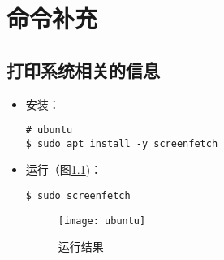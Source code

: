 \chapter{命令补充}

\section{打印系统相关的信息}
\begin{itemize}
\item 安装：
\begin{lstlisting}
# ubuntu 
$ sudo apt install -y screenfetch 
\end{lstlisting}

\item 运行（图\ref{fig-ubuntu_screenfetch})：
\begin{lstlisting}
$ sudo screenfetch
\end{lstlisting}


\begin{figure}[hbt!] 
    \centering
    \texttt{[image: ubuntu]}
    \caption{运行结果} %
    \label{fig-ubuntu_screenfetch} %
\end{figure}
\end{itemize}
\newpage

